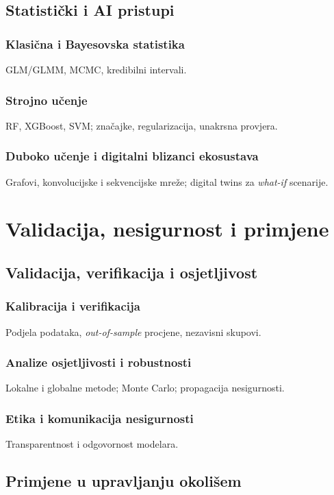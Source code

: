\documentclass[11pt,oneside]{book}
\begin{document}
	\chapter{Statistički i AI pristupi}
	\section{Klasična i Bayesovska statistika}
	GLM/GLMM, MCMC, kredibilni intervali.
	\section{Strojno učenje}
	RF, XGBoost, SVM; značajke, regularizacija, unakrsna provjera.
	\section{Duboko učenje i digitalni blizanci ekosustava}
	Grafovi, konvolucijske i sekvencijske mreže; digital twins za \emph{what-if} scenarije.
	
	\part{Validacija, nesigurnost i primjene}
	
	\chapter{Validacija, verifikacija i osjetljivost}
	\section{Kalibracija i verifikacija}
	Podjela podataka, \emph{out-of-sample} procjene, nezavisni skupovi.
	\section{Analize osjetljivosti i robustnosti}
	Lokalne i globalne metode; Monte Carlo; propagacija nesigurnosti.
	\section{Etika i komunikacija nesigurnosti}
	Transparentnost i odgovornost modelara.
	
	\chapter{Primjene u upravljanju okolišem}
\end{document}
